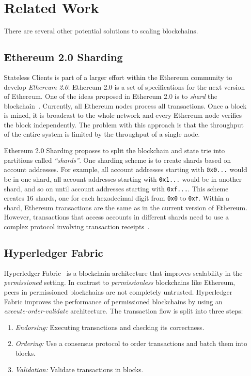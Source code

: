 \documentclass[12pt]{article}
\newcounter{protocol}
\newcommand{\System}{Stateless Clients\xspace}
\begin{document}
\section{Related Work}

There are several other potential solutions to scaling blockchains.

\subsection{Ethereum 2.0 Sharding} \label{subsection:ethereumsharding}


\System is part of a larger effort within the Ethereum community to develop \emph{Ethereum 2.0}. Ethereum 2.0 is a set of specifications for the next version of Ethereum. One of the ideas proposed in Ethereum 2.0 is to \emph{shard} the blockchain~\cite{ethereum-sharding}. Currently, all Ethereum nodes process all transactions. Once a block is mined, it is broadcast to the whole network and every Ethereum node verifies the block independently. The problem with this approach is that the throughput of the entire system is limited by the throughput of a single node.

Ethereum 2.0 Sharding proposes to split the blockchain and state trie into partitions called \emph{``shards''}. One sharding scheme is to create shards based on account addresses. For example, all account addresses starting with \texttt{0x0...} would be in one shard, all account addresses starting with \texttt{0x1...} would be in another shard, and so on until account addresses starting with \texttt{0xf...}. This scheme creates 16 shards, one for each hexadecimal digit from \texttt{0x0} to \texttt{0xf}. Within a shard, Ethereum transactions are the same as in the current version of Ethereum. However, transactions that access accounts in different shards need to use a complex protocol involving transaction receipts~\cite{ethereum-cross-shard}.


\subsection{Hyperledger Fabric}

Hyperledger Fabric~\cite{androulaki2018hyperledger} is a blockchain architecture that improves scalability in the \emph{permissioned} setting. In contrast to \emph{permissionless} blockchains like Ethereum, peers in permissioned blockchains are not completely untrusted. Hyperledger Fabric improves the performance of permissioned blockchains by using an \emph{execute-order-validate} architecture. The transaction flow is split into three steps:
\begin{enumerate}
  \item \emph{Endorsing:} Executing transactions and checking its correctness.
  \item \emph{Ordering:} Use a consensus protocol to order transactions and batch them into blocks.
  \item \emph{Validation:} Validate transactions in blocks.
\end{enumerate}
\end{document}
